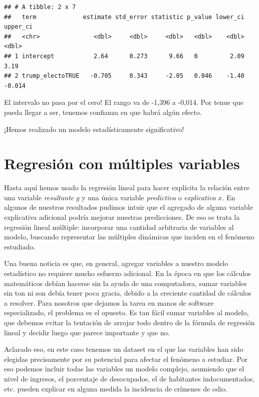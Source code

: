 \documentclass[
]{book}
\begin{document}
\begin{verbatim}
## # A tibble: 2 x 7
##   term             estimate std_error statistic p_value lower_ci upper_ci
##   <chr>               <dbl>     <dbl>     <dbl>   <dbl>    <dbl>    <dbl>
## 1 intercept           2.64      0.273      9.66   0         2.09    3.19 
## 2 trump_electoTRUE   -0.705     0.343     -2.05   0.046    -1.40   -0.014
\end{verbatim}

El intervalo no pasa por el cero! El rango va de -1,396 a -0,014. Por tenue que pueda llegar a ser, tenemos confianza en que habrá algún efecto.

¡Hemos realizado un modelo estadísticamente significativo!

\hypertarget{regresiuxf3n-con-muxfaltiples-variables}{%
\section{Regresión con múltiples variables}\label{regresiuxf3n-con-muxfaltiples-variables}}

Hasta aquí hemos usado la regresión lineal para hacer explícita la relación entre una variable \emph{resultante} \(y\) y una única variable \emph{predictiva} o \emph{explicativa} \(x\). En algunos de nuestros resultados pudimos intuir que el agregado de alguna variable explicativa adicional podría mejorar nuestras predicciones. De eso se trata la regresión lineal múltiple: incorporar una cantidad arbitraria de variables al modelo, buscando representar las múltiples dinámicas que inciden en el fenómeno estudiado.

Una buena noticia es que, en general, agregar variables a nuestro modelo estadístico no requiere mucho esfuerzo adicional. En la época en que los cálculos matemáticos debían hacerse sin la ayuda de una computadora, sumar variables sin ton ni son debía tener poca gracia, debido a la creciente cantidad de cálculos a resolver. Para nosotros que dejamos la tarea en manos de software especializado, el problema es el opuesto. Es tan fácil sumar variables al modelo, que debemos evitar la tentación de arrojar todo dentro de la fórmula de regresión lineal y decidir luego que parece importante y que no.

Aclarado eso, en este caso tenemos un dataset en el que las variables han sido elegidas precisamente por su potencial para afectar el fenómeno a estudiar. Por eso podemos incluir todas las variables un modelo complejo, asumiendo que el nivel de ingresos, el porcentaje de desocupados, el de habitantes indocumentados, etc. pueden explicar en alguna medida la incidencia de crímenes de odio.
\end{document}
